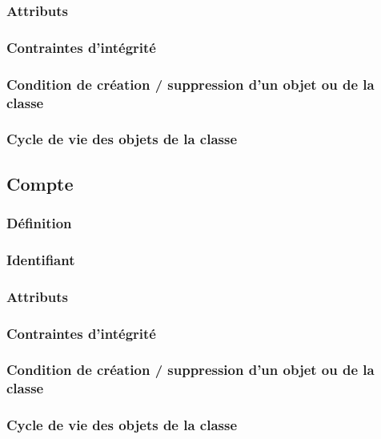 \documentclass[a4paper, 11pt]{report}
\begin{document}
\subsubsection{Attributs}

\subsubsection{Contraintes d'intégrité}

\subsubsection{Condition de création / suppression d'un objet ou de la classe}

\subsubsection{Cycle de vie des objets de la classe}

\subsection{Compte}

\subsubsection{Définition}

\subsubsection{Identifiant}

\subsubsection{Attributs}

\subsubsection{Contraintes d'intégrité}

\subsubsection{Condition de création / suppression d'un objet ou de la classe}

\subsubsection{Cycle de vie des objets de la classe}
\end{document}
